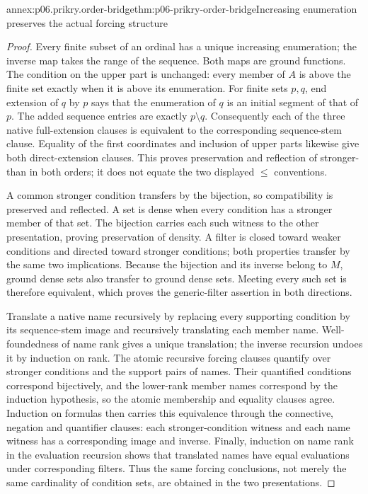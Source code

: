 \begin{annexitem}{annex:p06.prikry.order-bridge}{thm:p06-prikry-order-bridge}{Increasing enumeration preserves the actual forcing structure}
\begin{proof}
Every finite subset of an ordinal has a unique increasing enumeration;
the inverse map takes the range of the sequence. Both maps are ground
functions. The condition on the upper part is unchanged: every member of
\(A\) is above the finite set exactly when it is above its enumeration.
For finite sets \(p,q\), end extension of \(q\) by \(p\) says that
the enumeration of \(q\) is an initial segment of that of \(p\).
The added sequence entries are exactly \(p\setminus q\). Consequently
each of the three native full-extension clauses is equivalent to the
corresponding sequence-stem clause. Equality of the first coordinates
and inclusion of upper parts likewise give both direct-extension clauses.
This proves preservation and reflection of stronger-than in both orders;
it does not equate the two displayed \(\leq\) conventions.

A common stronger condition transfers by the bijection, so compatibility
is preserved and reflected. A set is dense when every condition has a
stronger member of that set. The bijection carries each such witness to
the other presentation, proving preservation of density. A filter is
closed toward weaker conditions and directed toward stronger conditions;
both properties transfer by the same two implications. Because the
bijection and its inverse belong to \(M\), ground dense sets also transfer
to ground dense sets. Meeting every such set is therefore equivalent,
which proves the generic-filter assertion in both directions.

Translate a native name recursively by replacing every supporting
condition by its sequence-stem image and recursively translating each
member name. Well-foundedness of name rank gives a unique translation;
the inverse recursion undoes it by induction on rank. The atomic
recursive forcing clauses quantify over stronger conditions and the
support pairs of names. Their quantified conditions correspond
bijectively, and the lower-rank member names correspond by the induction
hypothesis, so the atomic membership and equality clauses agree. Induction
on formulas then carries this equivalence through the connective,
negation and quantifier clauses: each stronger-condition witness and each
name witness has a corresponding image and inverse. Finally, induction
on name rank in the evaluation recursion shows that translated names
have equal evaluations under corresponding filters. Thus the same
forcing conclusions, not merely the same cardinality of condition sets,
are obtained in the two presentations.
\end{proof}
\end{annexitem}

